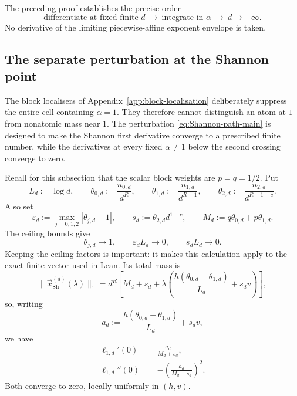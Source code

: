\documentclass[aps,pra,11pt,onecolumn,nofootinbib,tightenlines]{revtex4-2}
\theoremstyle{definition}
\begin{document}
The preceding proof establishes the precise order
\begin{equation}
 \boxed{
 \text{differentiate at fixed finite }d
 \ \longrightarrow\ 
 \text{integrate in }\alpha
 \ \longrightarrow\ 
 d\to+\infty.}
 \label{eq:app-order-operations}
\end{equation}
No derivative of the limiting piecewise-affine exponent envelope is taken.

\subsection{The separate perturbation at the Shannon point}
\label{app:Shannon-localisation}

The block localisers of Appendix~\ref{app:block-localisation} deliberately suppress the entire cell containing $\alpha=1$.  They therefore cannot distinguish an atom at $1$ from nonatomic mass near $1$.  The perturbation \eqref{eq:Shannon-path-main} is designed to make the Shannon first derivative converge to a prescribed finite number, while the derivatives at every fixed $\alpha\neq1$ below the second crossing converge to zero.

Recall for this subsection that the scalar block weights are $p=q=1/2$.  Put
\begin{equation}
 L_d:=\log d,
 \qquad
 \theta_{0,d}:=\frac{n_{0,d}}{d^R},
 \qquad
 \theta_{1,d}:=\frac{n_{1,d}}{d^{R-1}},
 \qquad
 \theta_{2,d}:=\frac{n_{2,d}}{d^{R-1-c}}.
 \label{eq:app-Shannon-L-theta}
\end{equation}
Also set
\begin{equation}
 \varepsilon_d:=\max_{j=0,1,2}|\theta_{j,d}-1|,
 \qquad
 s_d:=\theta_{2,d}d^{1-c},
 \qquad
 M_d:=q\theta_{0,d}+p\theta_{1,d}.
 \label{eq:app-Shannon-rounding-data}
\end{equation}
The ceiling bounds give
\begin{equation}
 \theta_{j,d}\longrightarrow1,
 \qquad
 \varepsilon_dL_d\longrightarrow0,
 \qquad
 s_dL_d\longrightarrow0.
 \label{eq:app-Shannon-rounding-limits}
\end{equation}
Keeping the ceiling factors is important: it makes this calculation apply to
the exact finite vector used in Lean.  Its total mass is
\begin{equation}
 \|\vec x_{\mathrm{Sh}}^{(d)}(\lambda)\|_1
 =d^R\left[
 M_d+s_d+\lambda\left(
 \frac{h(\theta_{0,d}-\theta_{1,d})}{L_d}+s_dv
 \right)\right],
 \label{eq:app-Shannon-total-mass}
\end{equation}
so, writing
\begin{equation}
 a_d:=\frac{h(\theta_{0,d}-\theta_{1,d})}{L_d}+s_dv,
 \label{eq:app-Shannon-a-d}
\end{equation}
we have
\begin{align}
 \ell_{1,d}'(0)
 &=\frac{a_d}{M_d+s_d},
 \label{eq:app-Shannon-norm-first}\\
 \ell_{1,d}''(0)
 &=-\left(\frac{a_d}{M_d+s_d}\right)^2.
 \label{eq:app-Shannon-norm-second}
\end{align}
Both converge to zero, locally uniformly in $(h,v)$.
\end{document}
